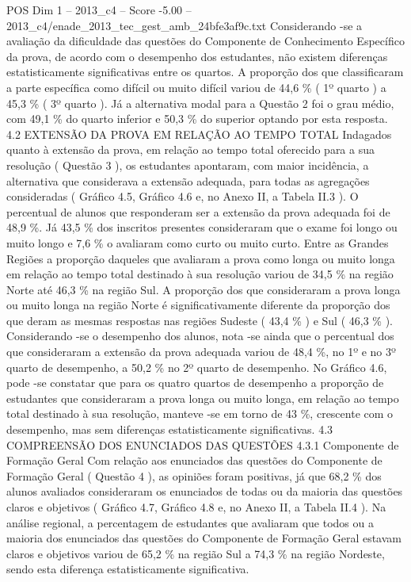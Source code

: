 \begin{textsample}{POS Dim 1 – 2013\_c4 – Score -5.00 – 2013\_c4/enade\_2013\_tec\_gest\_amb\_24bfe3af9c.txt}
Considerando -se a avaliação da dificuldade das questões do Componente de Conhecimento Específico da prova, de acordo com o desempenho dos estudantes, não existem diferenças estatisticamente significativas entre os quartos.
A proporção dos que classificaram a parte específica como difícil ou muito difícil variou de 44,6 \% ( 1º quarto ) a 45,3 \% ( 3º quarto ).
Já a alternativa modal para a Questão 2 foi o grau médio, com 49,1 \% do quarto inferior e 50,3 \% do superior optando por esta resposta. 4.2 EXTENSÃO DA PROVA EM RELAÇÃO AO TEMPO TOTAL Indagados quanto à extensão da prova, em relação ao tempo total oferecido para a sua resolução ( Questão 3 ), os estudantes apontaram, com maior incidência, a alternativa que considerava a extensão adequada, para todas as agregações consideradas ( Gráfico 4.5, Gráfico 4.6 e, no Anexo II, a Tabela II.3 ).
O percentual de alunos que responderam ser a extensão da prova adequada foi de 48,9 \%.
Já 43,5 \% dos inscritos presentes consideraram que o exame foi longo ou muito longo e 7,6 \% o avaliaram como curto ou muito curto.
Entre as Grandes Regiões a proporção daqueles que avaliaram a prova como longa ou muito longa em relação ao tempo total destinado à sua resolução variou de 34,5 \% na região Norte até 46,3 \% na região Sul.
A proporção dos que consideraram a prova longa ou muito longa na região Norte é significativamente diferente da proporção dos que deram as mesmas respostas nas regiões Sudeste ( 43,4 \% ) e Sul ( 46,3 \% ).
Considerando -se o desempenho dos alunos, nota -se ainda que o percentual dos que consideraram a extensão da prova adequada variou de 48,4 \%, no 1º e no 3º quarto de desempenho, a 50,2 \% no 2º quarto de desempenho.
No Gráfico 4.6, pode -se constatar que para os quatro quartos de desempenho a proporção de estudantes que consideraram a prova longa ou muito longa, em relação ao tempo total destinado à sua resolução, manteve -se em torno de 43 \%, crescente com o desempenho, mas sem diferenças estatisticamente significativas. 4.3 COMPREENSÃO DOS ENUNCIADOS DAS QUESTÕES 4.3.1 Componente de Formação Geral Com relação aos enunciados das questões do Componente de Formação Geral ( Questão 4 ), as opiniões foram positivas, já que 68,2 \% dos alunos avaliados consideraram os enunciados de todas ou da maioria das questões claros e objetivos ( Gráfico 4.7, Gráfico 4.8 e, no Anexo II, a Tabela II.4 ).
Na análise regional, a percentagem de estudantes que avaliaram que todos ou a maioria dos enunciados das questões do Componente de Formação Geral estavam claros e objetivos variou de 65,2 \% na região Sul a 74,3 \% na região Nordeste, sendo esta diferença estatisticamente significativa.

\end{textsample}

